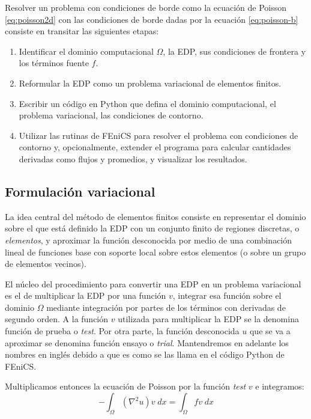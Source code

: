 Resolver un problema con condiciones de borde como la ecuación de Poisson \eqref{eq:poisson2d} con las condiciones de borde dadas por la ecuación \eqref{eq:poisson-b} consiste en transitar las siguientes etapas:
\begin{enumerate}
 \item Identificar el dominio computacional $\Omega$, la EDP, sus condiciones de frontera y los términos fuente $f$.
 \item Reformular la EDP como un problema variacional de elementos finitos.
 \item Escribir un código en Python que defina el dominio computacional, el problema variacional, las condiciones de contorno.
 \item Utilizar las rutinas de FEniCS para resolver el problema con condiciones de contorno y, opcionalmente, extender el programa para calcular cantidades derivadas como flujos y promedios, y visualizar los resultados.
\end{enumerate}

\subsection{Formulación variacional}
La idea central del método de elementos finitos consiste en representar el dominio sobre el que está definido la EDP con un conjunto finito de regiones discretas, o \textit{elementos}, y aproximar la función desconocida por medio de una combinación lineal de funciones base con soporte local sobre estos elementos (o sobre un grupo de elementos vecinos).

El núcleo del procedimiento para convertir una EDP en un problema variacional es el de multiplicar la EDP por una función $v$, integrar esa función sobre el dominio $\Omega$ mediante integración por partes de los términos con derivadas de segundo orden. A la función $v$ utilizada para multiplicar la EDP se la denomina función de prueba o \textit{test}. Por otra parte, la función desconocida $u$ que se va a aproximar se denomina función ensayo o \textit{trial}. Mantendremos en adelante los nombres en inglés debido a que es como se las llama en el código Python de FEniCS.

Multiplicamos entonces la ecuación de Poisson por la función \textit{test} $v$ e integramos:
\begin{equation}\label{eq:fem01}
 -\int_{\Omega} (\nabla^2 u) v \; dx = \int_{\Omega} f v \; dx
\end{equation} 


